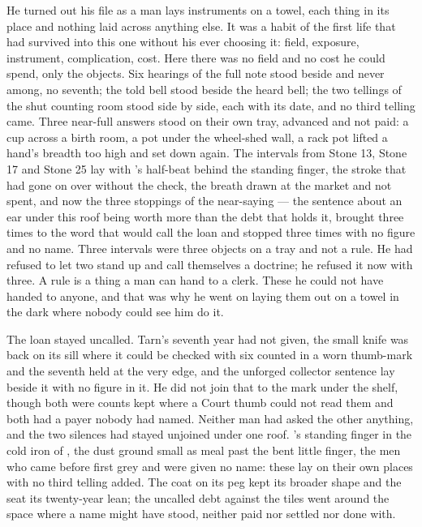 \scenebreak

He turned out his file as a man lays instruments on a towel, each thing in its place and nothing laid across anything else. It was a habit of the first life that had survived into this one without his ever choosing it: field, exposure, instrument, complication, cost. Here there was no field and no cost he could spend, only the objects. Six hearings of the full note stood beside and never among, no seventh; the told bell stood beside the heard bell; the two tellings of the shut counting room stood side by side, each with its date, and no third telling came. Three near-full answers stood on their own tray, advanced and not paid: a cup across a birth room, a pot under the wheel-shed wall, a rack pot lifted a hand's breadth too high and set down again. The intervals from Stone 13, Stone 17 and Stone 25 lay with 's half-beat behind the standing finger, the stroke that had gone on over  without the check, the breath drawn at the market and not spent, and now the three stoppings of the near-saying --- the sentence about an ear under this roof being worth more than the debt that holds it, brought three times to the word that would call the loan and stopped three times with no figure and no name. Three intervals were three objects on a tray and not a rule. He had refused to let two stand up and call themselves a doctrine; he refused it now with three. A rule is a thing a man can hand to a clerk. These he could not have handed to anyone, and that was why he went on laying them out on a towel in the dark where nobody could see him do it.

The loan stayed uncalled. Tarn's seventh year had not given, the small knife was back on its sill where it could be checked with six counted in a worn thumb-mark and the seventh held at the very edge, and the unforged collector sentence lay beside it with no figure in it. He did not join that to the mark under the shelf, though both were counts kept where a Court thumb could not read them and both had a payer nobody had named. Neither man had asked the other anything, and the two silences had stayed unjoined under one roof. 's standing finger in the cold iron of , the dust ground small as meal past the bent little finger, the men who came before first grey and were given no name: these lay on their own places with no third telling added. The coat on its peg kept its broader shape and the seat its twenty-year lean; the uncalled debt against the tiles went around the space where a name might have stood, neither paid nor settled nor done with.

